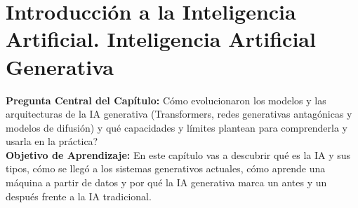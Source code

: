 
\section[Introducción a la Inteligencia Artificial. IA Generativa]{Introducción a la Inteligencia Artificial. Inteligencia Artificial Generativa}

\begin{cajabeige}
\textbf{Pregunta Central del Capítulo:} \textquestiondown Cómo evolucionaron los modelos y las arquitecturas de la IA generativa (Transformers, redes generativas antagónicas y modelos de difusión) y qué capacidades y límites plantean para comprenderla y usarla en la práctica?\\[0.25cm]
\textbf{Objetivo de Aprendizaje:} En este capítulo vas a descubrir qué es la IA y sus tipos, cómo se llegó a los sistemas generativos actuales, cómo aprende una máquina a partir de datos y por qué la IA generativa marca un antes y un después frente a la IA tradicional.
\end{cajabeige}


